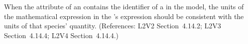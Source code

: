 When the  attribute of an \EventAssignment
contains the identifier of a \Species in the model, the
units of the mathematical expression in the
\EventAssignment's  expression should be
consistent with the units of that species' quantity.
(References: L2V2 Section~4.14.2; L2V3 Section~4.14.4; L2V4 Section~4.14.4.)
